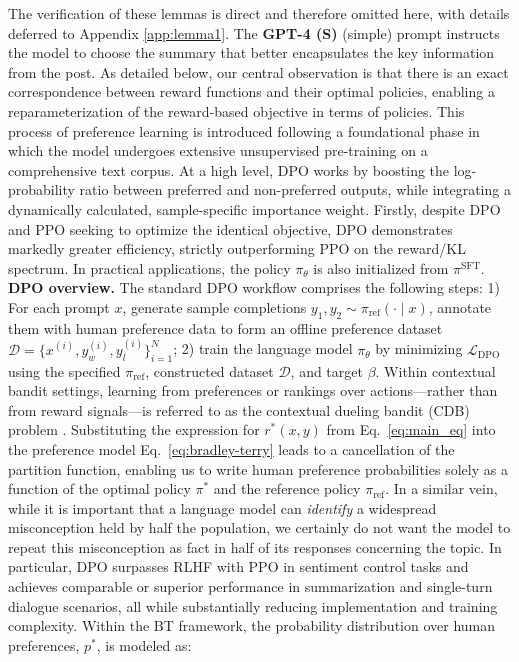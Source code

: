 \begin{lemma}
\begin{theorem}
The verification of these lemmas is direct and therefore omitted here, with details deferred to Appendix \ref{app:lemma1}. The \textbf{GPT-4 (S)} (simple) prompt instructs the model to choose the summary that better encapsulates the key information from the post. As detailed below, our central observation is that there is an exact correspondence between reward functions and their optimal policies, enabling a reparameterization of the reward-based objective in terms of policies. This process of preference learning is introduced following a foundational phase in which the model undergoes extensive unsupervised pre-training on a comprehensive text corpus. At a high level, DPO works by boosting the log-probability ratio between preferred and non-preferred outputs, while integrating a dynamically calculated, sample-specific importance weight. Firstly, despite DPO and PPO seeking to optimize the identical objective, DPO demonstrates markedly greater efficiency, strictly outperforming PPO on the reward/KL spectrum. In practical applications, the policy $\pi_\theta$ is also initialized from $\pi^\text{SFT}$. \textbf{DPO overview.} The standard DPO workflow comprises the following steps: 1) For each prompt $x$, generate sample completions $y_1, y_2 \sim \pi_\text{ref}(\cdot \mid x)$, annotate them with human preference data to form an offline preference dataset $\mathcal{D} = \{x^{(i)}, y_w^{(i)}, y_l^{(i)}\}_{i=1}^N$; 2) train the language model $\pi_\theta$ by minimizing $\mathcal{L}_\text{DPO}$ using the specified $\pi_\text{ref}$, constructed dataset $\mathcal{D}$, and target $\beta$. Within contextual bandit settings, learning from preferences or rankings over actions—rather than from reward signals—is referred to as the contextual dueling bandit (CDB) problem \citep{yue2012karmed,dudik2015contextual}. Substituting the expression for $r^*(x,y)$ from Eq.~\ref{eq:main_eq} into the preference model Eq.~\ref{eq:bradley-terry} leads to a cancellation of the partition function, enabling us to write human preference probabilities solely as a function of the optimal policy $\pi^*$ and the reference policy $\pi_\text{ref}$. In a similar vein, while it is important that a language model can \textit{identify} a widespread misconception held by half the population, we certainly do not want the model to repeat this misconception as fact in half of its responses concerning the topic. In particular, DPO surpasses RLHF with PPO in sentiment control tasks and achieves comparable or superior performance in summarization and single-turn dialogue scenarios, all while substantially reducing implementation and training complexity. Within the BT framework, the probability distribution over human preferences, $p^*$, is modeled as:


\end{theorem}
\end{lemma}
